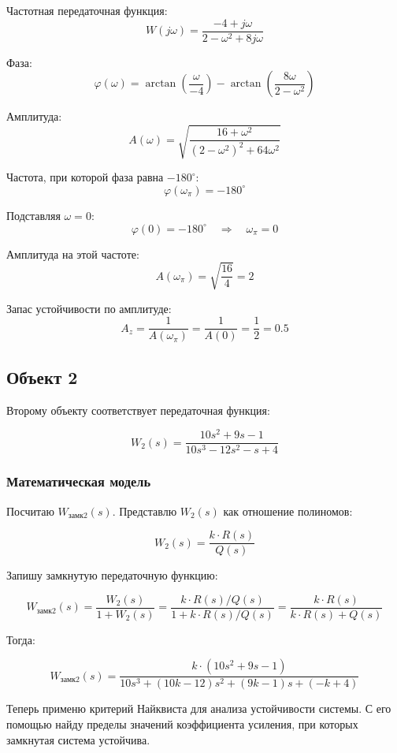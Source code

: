 \documentclass[a4paper,12pt]{article}
\begin{document}
	Частотная передаточная функция:
	\[
	W(j \omega) =
	\frac{-4 + j \omega}{2 - \omega^2 + 8 j \omega}
	\]
	
	Фаза:
	\[
	\varphi(\omega) =
	\arctan \left(\dfrac{\omega}{-4} \right)
	-
	\arctan\left(\dfrac{8\omega}{2 - \omega^2}\right)
	\]
	
	Амплитуда:
	\[
	A(\omega)
	=\sqrt{\frac{16+\omega^2}{(2-\omega^2)^2+64\omega^2}}
	\]
	
	Частота, при которой фаза равна \(-180^\circ\):
	\[
	\varphi(\omega_\pi)=-180^\circ
	\]
	
	Подставляя \(\omega=0\):
	\[
	\varphi(0)=-180^\circ
	\quad \Longrightarrow \quad
	\omega_\pi=0
	\]
	
	Амплитуда на этой частоте:
	\[
	A(\omega_\pi)=
	\sqrt{\frac{16}{4}}
	=2
	\]
	
	Запас устойчивости по амплитуде:
	\[
	A_z=\frac{1}{A(\omega_\pi)}
	=
	\frac{1}{A(0)}
	=
	\frac{1}{2}
	=
	0.5
	\]



	
	 
	
	\newpage
	\subsection{Объект 2}
	
	Второму объекту соответствует передаточная функция:
	
	\[W_2(s) = \dfrac{10s^2 + 9s - 1}{10s^3 - 12s^2 - s + 4}\]
	
	\subsubsection{Математическая модель}
	
	Посчитаю \(W_\text{замк2}(s)\). Представлю \(W_2(s)\) как отношение полиномов:
	
	\[W_2(s) = \frac{k \cdot R(s)}{Q(s)}\]
	
	Запишу замкнутую передаточную функцию:
	
	\[W_\text{замк2}(s) = \frac{W_2(s)}{1 + W_2(s)} = \frac{k \cdot R(s) / Q(s)}{1 + k \cdot R(s) / Q(s)} = \frac{k \cdot R(s)}{k \cdot R(s) + Q(s)}\]
	
	Тогда: 
	
	\[W_\text{замк2}(s) = \frac{k \cdot(10s^2 + 9s - 1)}{10s^3 + (10k - 12)s^2 + (9k -1)s + (-k + 4)}\]
	
	Теперь применю критерий Найквиста для анализа устойчивости системы.
	С его помощью найду пределы значений коэффициента усиления,
	при которых замкнутая система устойчива.
	
\end{document}
